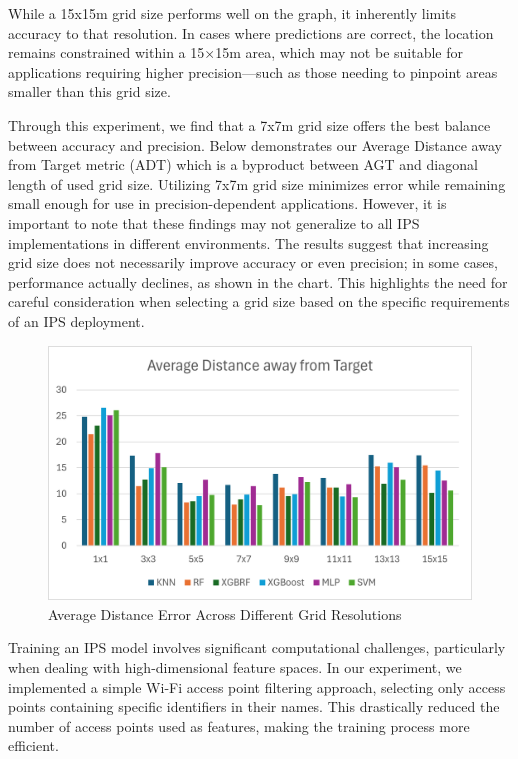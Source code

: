 \documentclass[runningheads]{llncs}
\begin{document}
While a 15x15m grid size performs well on the graph, it inherently limits accuracy to that resolution. In cases where predictions are correct, the location remains constrained within a 15×15m area, which may not be suitable for applications requiring higher precision—such as those needing to pinpoint areas smaller than this grid size.

Through this experiment, we find that a 7x7m grid size offers the best balance between accuracy and precision. Below demonstrates our Average Distance away from Target metric (ADT) which is a byproduct between AGT and diagonal length of used grid size. Utilizing 7x7m grid size minimizes error while remaining small enough for use in precision-dependent applications. However, it is important to note that these findings may not generalize to all IPS implementations in different environments. The results suggest that increasing grid size does not necessarily improve accuracy or even precision; in some cases, performance actually declines, as shown in the chart. This highlights the need for careful consideration when selecting a grid size based on the specific requirements of an IPS deployment.





\begin{figure}[htbp]
	\centerline{\includegraphics[scale=0.65]{image2.png}}
	\caption{Average Distance Error Across Different Grid Resolutions}
	\label{fig:Avg_dis_err}
\end{figure}



Training an IPS model involves significant computational challenges, particularly when dealing with high-dimensional feature spaces. In our experiment, we implemented a simple Wi-Fi access point filtering approach, selecting only access points containing specific identifiers in their names. This drastically reduced the number of access points used as features, making the training process more efficient.
\end{document}

